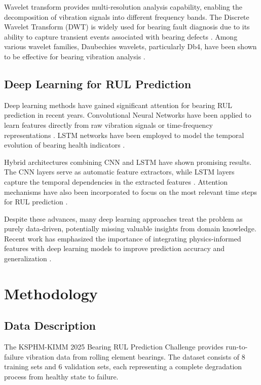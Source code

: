\documentclass[conference,twocolumn]{IEEEtran}
\begin{document}
Wavelet transform provides multi-resolution analysis capability, enabling the decomposition of vibration signals into different frequency bands. The Discrete Wavelet Transform (DWT) is widely used for bearing fault diagnosis due to its ability to capture transient events associated with bearing defects \cite{kumar2013wavelet}. Among various wavelet families, Daubechies wavelets, particularly Db4, have been shown to be effective for bearing vibration analysis \cite{toma2020bearing, nizwan2016wavelet}.

\subsection{Deep Learning for RUL Prediction}

Deep learning methods have gained significant attention for bearing RUL prediction in recent years. Convolutional Neural Networks have been applied to learn features directly from raw vibration signals or time-frequency representations \cite{li2018remaining}. LSTM networks have been employed to model the temporal evolution of bearing health indicators \cite{zhao2017machine}.

Hybrid architectures combining CNN and LSTM have shown promising results. The CNN layers serve as automatic feature extractors, while LSTM layers capture the temporal dependencies in the extracted features \cite{chen2020bearing}. Attention mechanisms have also been incorporated to focus on the most relevant time steps for RUL prediction \cite{wang2020remaining}.

Despite these advances, many deep learning approaches treat the problem as purely data-driven, potentially missing valuable insights from domain knowledge. Recent work has emphasized the importance of integrating physics-informed features with deep learning models to improve prediction accuracy and generalization \cite{li2020deep}.

\section{Methodology}

\subsection{Data Description}

The KSPHM-KIMM 2025 Bearing RUL Prediction Challenge provides run-to-failure vibration data from rolling element bearings. The dataset consists of 8 training sets and 6 validation sets, each representing a complete degradation process from healthy state to failure.
\end{document}
